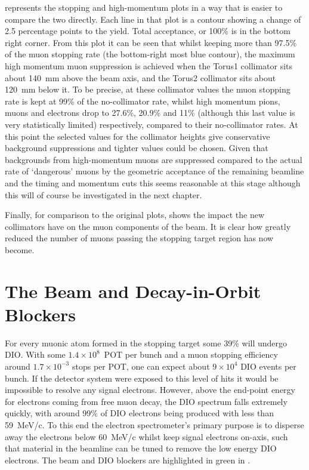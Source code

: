 \FigOptimMuBeamCollimMuonPathsWColl
{} represents the stopping and high-momentum plots in a way that is easier to compare the two directly.
Each line in that plot is a contour showing a change of 2.5 percentage points to the yield.  Total acceptance, or 100\% is in the bottom right corner.
From this plot it can be seen that whilst keeping more than 97.5\% of the muon stopping rate (the bottom-right most blue contour), the maximum high momentum muon suppression is achieved when the Torus1 collimator sits about 140~mm above the beam axis, and the Torus2 collimator sits about 120~mm below it.
To be precise, at these collimator values  the muon stopping rate is kept at 99\% of the no-collimator rate, whilst high momentum pions, muons and electrons drop to 27.6\%, 20.9\% and 11\% (although this last value is very statistically limited) respectively, compared to their no-collimator rates.
At this point the selected values for the collimator heights give conservative background suppressions and tighter values could be chosen.
Given that backgrounds from high-momentum muons are suppressed compared to the actual rate of `dangerous' muons by the geometric acceptance of the remaining beamline and the timing and momentum cuts this seems reasonable at this stage although this will of course be investigated in the next chapter.

Finally, for comparison to the original plots,  shows the impact the new collimators have on the muon components of the beam.
It is clear how greatly reduced the number of muons passing the stopping target region has now become.
\clearpage

\section{The Beam and Decay-in-Orbit Blockers}
\FigOptimDIOBeamBlockGeometry
\FigOptimDIOBeamBlockESTDispersion
For every muonic atom formed in the stopping target some 39\% will undergo \acf{DIO}.
With some $1.4\times10^{8}$~\ac{POT} per bunch and a muon stopping efficiency around $1.7\times10^{-3}$ stops per \ac{POT}, one can expect about $9\times10^{4}$ DIO events per bunch.
If the detector system were exposed to this level of hits it would be impossible to resolve any signal electrons.
However, above the end-point energy for electrons coming from free muon decay, the DIO spectrum falls extremely quickly, with around 99\% of DIO electrons being produced with less than 59~MeV/c.
To this end the electron spectrometer's primary purpose is to disperse away the electrons below 60~MeV/c whilst keep signal electrons on-axis, such that material in the beamline can be tuned to remove the low energy DIO electrons.
The beam and DIO blockers are highlighted in green in .

